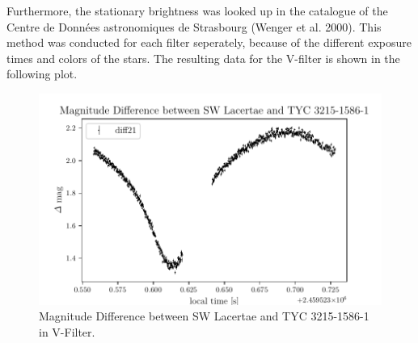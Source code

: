   Furthermore, the stationary brightness was looked up in the catalogue of the Centre de Données 
  astronomiques de Strasbourg (Wenger et al. 2000).
  This method was conducted for each filter seperately, because of the different 
  exposure times and colors of the stars.
  The resulting data for the V-filter is shown in the following plot.
  \begin{figure}[H]
    \centering
    \includegraphics{V-Filter.pdf}
    \caption{Magnitude Difference between SW Lacertae and TYC 3215-1586-1 in V-Filter.}
    \label{fig:plot}
  \end{figure}


